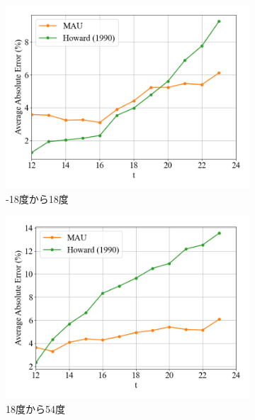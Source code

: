 \begin{figure}[htbp]
            \begin{subfigure}{0.5\textwidth}
              \centering
              \includegraphics[width=\textwidth]{figures/exp1/lng_error_3.png}
              \caption{-18度から18度}
              \label{fig:exp1_lng_error_3}
            \end{subfigure}
            \begin{subfigure}{0.5\textwidth}
              \centering
              \includegraphics[width=\textwidth]{figures/exp1/lng_error_4.png}
              \caption{18度から54度}
              \label{fig:exp1_lng_error_4}
            \end{subfigure} \par
            \begin{subfigure}{0.5\textwidth}

\end{subfigure}
\end{figure}
